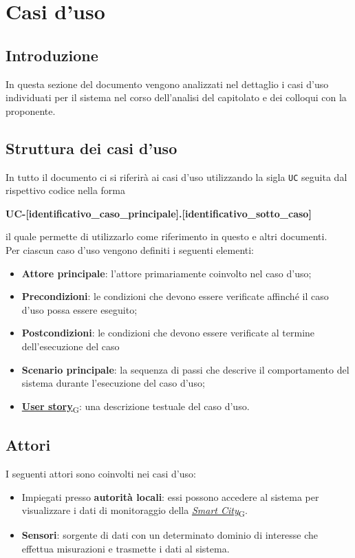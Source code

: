 \section{Casi d'uso}
\subsection{Introduzione}
In questa sezione del documento vengono analizzati nel dettaglio i casi d'uso individuati per il sistema
nel corso dell'analisi del capitolato e dei colloqui con la proponente.

\subsection{Struttura dei casi d'uso}
In tutto il documento ci si riferirà ai casi d'uso utilizzando la sigla \texttt{UC} seguita dal rispettivo codice nella forma
\begin{center}
	\textbf{UC-[identificativo\_caso\_principale].[identificativo\_sotto\_caso]}
\end{center}
il quale permette di utilizzarlo come riferimento in questo e altri documenti.\\
Per ciascun caso d'uso vengono definiti i seguenti elementi:
\begin{itemize}
	\item \textbf{Attore principale}: l'attore primariamente coinvolto nel caso d'uso;
	\item \textbf{Precondizioni}: le condizioni che devono essere verificate affinché il caso d'uso possa essere
	      eseguito;
	\item \textbf{Postcondizioni}: le condizioni che devono essere verificate al termine dell'esecuzione del caso
	\item \textbf{Scenario principale}: la sequenza di passi che descrive il comportamento del sistema durante
	      l'esecuzione del caso d'uso;
	\item \href{https://7last.github.io/docs/rtb/documentazione-interna/glossario\#user-story}{\textbf{User story}\textsubscript{G}}: una descrizione testuale del caso d'uso.
\end{itemize}


\subsection{Attori}
I seguenti attori sono coinvolti nei casi d'uso:
\begin{itemize}
	\item Impiegati presso \textbf{autorità locali}: essi possono accedere al sistema per visualizzare i dati di
	      monitoraggio della \href{https://7last.github.io/docs/rtb/documentazione-interna/glossario\#smart-city}{\textit{Smart City}\textsubscript{G}}.
	\item \textbf{Sensori}: sorgente di dati con un determinato dominio di interesse che effettua misurazioni
	      e trasmette i dati al sistema.
\end{itemize}

